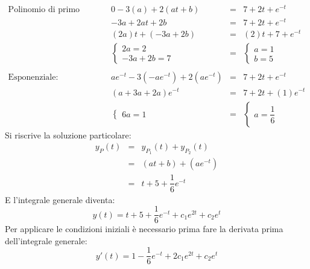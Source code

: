 \documentclass[a4paper]{article}
\begin{document}
	\begin{equation*}
		\begin{array}{lrcl}
			\text{Polinomio di primo grado:} & 0 - 3\left(a\right) + 2\left(at+b\right) &=& 7 + 2t + e^{-t} \\ [.5em]
			& -3a + 2at + 2b &=& 7 + 2t + e^{-t} \\ [.5em]
			& \left(2a\right)t + \left(-3a + 2b\right) &=& \left(2\right)t + 7 + e^{-t} \\ [.5em]
			& \begin{cases}
				2a = 2 \\
				-3a + 2b = 7
			\end{cases}
			&=&
			\begin{cases}
				a = 1 \\
				b = 5
			\end{cases} \\ \\
			\text{Esponenziale:} & ae^{-t} - 3\left(-ae^{-t}\right) + 2\left(ae^{-t}\right) &=& 7 + 2t + e^{-t} \\ [.5em]
			& \left(a + 3a + 2a\right)e^{-t} &=& 7 + 2t + \left(1\right)e^{-t} \\ [.5em]
			& \begin{cases}
				6a = 1
			\end{cases}
			&=&
			\begin{cases}
				a = \dfrac{1}{6}
			\end{cases}
		\end{array}
	\end{equation*}
	Si riscrive la soluzione particolare:
	\begin{equation*}
		\begin{array}{rcl}
			y_{P}\left(t\right) &=& y_{P_{1}}\left(t\right) + y_{P_{2}}\left(t\right) \\ [.7em]
			&=& \left(at + b\right) + \left(ae^{-t}\right) \\ [.7em]
			&=& t+5 + \dfrac{1}{6}e^{-t}
		\end{array}
	\end{equation*}
	E l'integrale generale diventa:
	\begin{equation*}
		y\left(t\right) = t+5 + \dfrac{1}{6}e^{-t} + c_{1}e^{2t} + c_{2}e^{t}
	\end{equation*}
	Per applicare le condizioni iniziali è necessario prima fare la derivata prima dell'integrale generale:
	\begin{equation*}
		y'\left(t\right) = 1 - \dfrac{1}{6}e^{-t} + 2c_{1}e^{2t} + c_{2}e^{t}
	\end{equation*}
\end{document}
